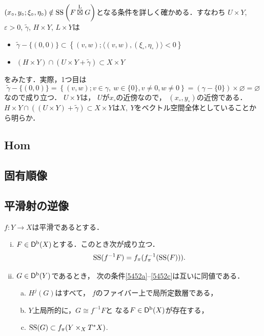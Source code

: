 \begin{CMT}
    \(
        (x_{\circ},y_{\circ};\xi_{\circ},\eta_{\circ})
        \notin
        \muS\left(F\lletens[] G\right)
    \)となる条件を詳しく確かめる．すなわち
    \(U\times Y\), \(\varepsilon>0\), 
    \(\widetilde{\gamma}\), \(H\times Y\), \(L\times Y\)は
    \begin{itemize}
        \item \(\widetilde{\gamma}-\{(0,0)\}
        \subset\left\{(v,w);
        \langle (v,w),(\xi_{\circ},\eta_{\circ})\rangle<0
        \right\}\)
        \item \((H\times Y)\cap(U\times Y+\tilde{\gamma})\subset X\times Y\)
    \end{itemize}
    をみたす．実際，1つ目は\[
        \widetilde{\gamma}-\{(0,0)\}
        =\left\{(v,w);
            v\in\gamma,\ w\in\{0\}, 
            v\ne0,w\ne0
        \right\}
        =(\gamma-\{0\})\times\varnothing=\varnothing
    \]なので成り立つ．
    \(U\times Y\)は，
    \(U\)が\(x_\circ\)の近傍なので，
    \((x_\circ,y_\circ)\)の近傍である．
    \(
        H\times Y\cap ((U\times Y)+\widetilde{\gamma})
        \subset X\times Y
    \)は\(X,\ Y\)をベクトル空間全体としていることから明らか．
\end{CMT}
\subsection*{Hom}
\subsection*{固有順像}
\subsection*{平滑射の逆像}
\begin{leftbar}
\begin{PRP}\label{prp545}
    \(f\colon Y\to X\)は平滑であるとする．
    \begin{enumerate}[(i)]
        \item \(F\in\Dompb(X)\)とする．このとき次が成り立つ．\[
            \muS(f^{-1}F)=\mpb[f](f_{\pi}^{-1}(\muS(F))).
        \]
        \item \(G\in\Dompb(Y)\)であるとき，
        次の条件\eqref{5452a}--\eqref{5452c}は互いに同値である．
        \begin{enumerate}[(a)]
            \item \(H^{j}(G)\)はすべて，
            \(f\)のファイバー上で局所定数層である，\label{5452a}
            \item \(Y\)上局所的に，\(G\cong f^{-1}F\)と
            なる\(F\in\Dompb(X)\)が存在する，\label{5452b}
            \item \(\muS(G)\subset \mpb[f](Y\times_X\cotb[X])\).\label{5452c}
        \end{enumerate}
    \end{enumerate}
\end{PRP}
\end{leftbar}


